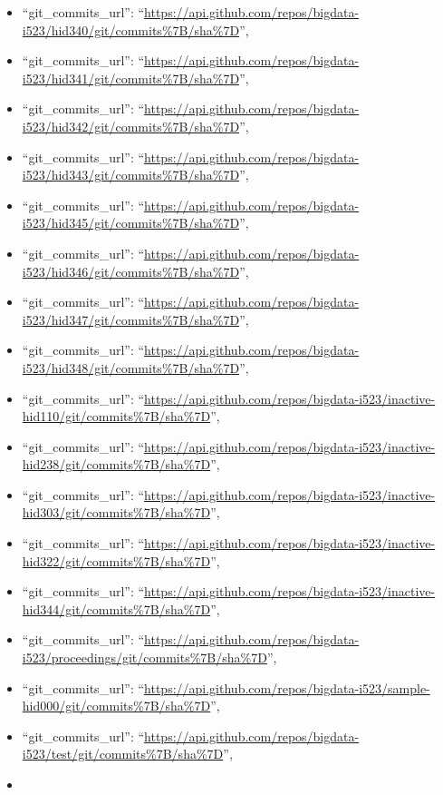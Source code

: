 \begin{itemize}
\item
  ``git\_commits\_url'':
  ``\url{https://api.github.com/repos/bigdata-i523/hid340/git/commits\%7B/sha\%7D}'',
\item
  ``git\_commits\_url'':
  ``\url{https://api.github.com/repos/bigdata-i523/hid341/git/commits\%7B/sha\%7D}'',
\item
  ``git\_commits\_url'':
  ``\url{https://api.github.com/repos/bigdata-i523/hid342/git/commits\%7B/sha\%7D}'',
\item
  ``git\_commits\_url'':
  ``\url{https://api.github.com/repos/bigdata-i523/hid343/git/commits\%7B/sha\%7D}'',
\item
  ``git\_commits\_url'':
  ``\url{https://api.github.com/repos/bigdata-i523/hid345/git/commits\%7B/sha\%7D}'',
\item
  ``git\_commits\_url'':
  ``\url{https://api.github.com/repos/bigdata-i523/hid346/git/commits\%7B/sha\%7D}'',
\item
  ``git\_commits\_url'':
  ``\url{https://api.github.com/repos/bigdata-i523/hid347/git/commits\%7B/sha\%7D}'',
\item
  ``git\_commits\_url'':
  ``\url{https://api.github.com/repos/bigdata-i523/hid348/git/commits\%7B/sha\%7D}'',
\item
  ``git\_commits\_url'':
  ``\url{https://api.github.com/repos/bigdata-i523/inactive-hid110/git/commits\%7B/sha\%7D}'',
\item
  ``git\_commits\_url'':
  ``\url{https://api.github.com/repos/bigdata-i523/inactive-hid238/git/commits\%7B/sha\%7D}'',
\item
  ``git\_commits\_url'':
  ``\url{https://api.github.com/repos/bigdata-i523/inactive-hid303/git/commits\%7B/sha\%7D}'',
\item
  ``git\_commits\_url'':
  ``\url{https://api.github.com/repos/bigdata-i523/inactive-hid322/git/commits\%7B/sha\%7D}'',
\item
  ``git\_commits\_url'':
  ``\url{https://api.github.com/repos/bigdata-i523/inactive-hid344/git/commits\%7B/sha\%7D}'',
\item
  ``git\_commits\_url'':
  ``\url{https://api.github.com/repos/bigdata-i523/proceedings/git/commits\%7B/sha\%7D}'',
\item
  ``git\_commits\_url'':
  ``\url{https://api.github.com/repos/bigdata-i523/sample-hid000/git/commits\%7B/sha\%7D}'',
\item
  ``git\_commits\_url'':
  ``\url{https://api.github.com/repos/bigdata-i523/test/git/commits\%7B/sha\%7D}'',
\item

\end{itemize}
